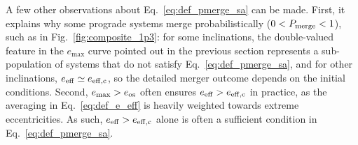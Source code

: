 \documentclass[
        fleqn,
        usenatbib,
    ]{mnras}
\begin{document}
A few other observations about Eq.~\eqref{eq:def_pmerge_sa} can be made.
First, it explains why some prograde systems merge probabilistically ($0 <
P_{\rm merge} < 1$), such as in Fig.~\ref{fig:composite_1p3}: for some
inclinations, the double-valued feature in the $e_{\max}$ curve pointed out in
the previous section represents a sub-population of systems that do not satisfy
Eq.~\eqref{eq:def_pmerge_sa}, and for other inclinations, $e_{\rm eff} \simeq
e_{\rm eff, c}$, so the detailed merger outcome depends on the initial
conditions. Second, $e_{\max} > e_{\rm os}$ often ensures $e_{\rm eff} > e_{\rm
eff, c}$ in practice, as the averaging in Eq.~\eqref{eq:def_e_eff} is heavily
weighted towards extreme eccentricities. As such, $e_{\rm eff} > e_{\rm eff, c}$
alone is often a sufficient condition in Eq.~\eqref{eq:def_pmerge_sa}.
\end{document}

